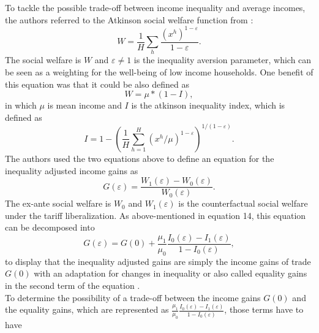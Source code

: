 To tackle the possible trade-off between income inequality and average incomes, the authors referred to the Atkinson social 
welfare function from \cite{Atkinson.1970}:
\begin{equation} \label{eq:equation13}
    W =\frac{1}{H}\sum_{h}\frac{(x^h)^{1-\varepsilon}}{1-\varepsilon}. 
\end{equation}
The social welfare is \(W\) and \(\varepsilon \neq 1\) is the inequality aversion parameter, which can be seen as a weighting for
the well-being of low income households. One benefit of this equation was that it could be also defined as 
\begin{equation} \label{eq:equation14}
    W = \mu * (1-I),
\end{equation}
in which \(\mu\) is mean income and \(I\) is the atkinson inequality index, which is defined as 
\begin{equation} \label{eq:equation15}
    I = 1-(\frac{1}{H}\sum_{h=1}^H (x^h/\mu)^{1-\varepsilon})^{1/(1-\varepsilon)}.
\end{equation}
The authors used the two equations above to define an equation for the inequality adjusted income gains as 
\begin{equation} \label{eq:equation16}
    G(\varepsilon)= \frac{W_{1}(\varepsilon)-W_{0}(\varepsilon)}{W_{0}(\varepsilon)}.
\end{equation}
The ex-ante social welfare is \(W_{0}\) and \(W_{1}(\varepsilon)\) is the counterfactual social welfare under the tariff liberalization.
As above-mentioned in equation 14, this equation can be decomposed into 
\begin{equation} \label{eq:equation17}
    G(\varepsilon)= G(0) + \frac{\mu_{1}}{\mu_{0}} \frac{I_{0}(\varepsilon)-I_{1}(\varepsilon)}{1-I_{0}(\varepsilon)},
\end{equation}
to display that the inequality adjusted gains are simply the income gains of trade \(G(0)\) with an adaptation for changes in inequality 
or also called equality gains in the second term of the equation \parencite[pp.~17-19]{Artuc.2019}. \\
To determine the possibility of a trade-off between the income gains \(G(0)\) and the equality gains, which are represented as 
\(\frac{\mu_{1}}{\mu_{0}} \frac{I_{0}(\varepsilon)-I_{1}(\varepsilon)}{1-I_{0}(\varepsilon)}\), those terms have to have
